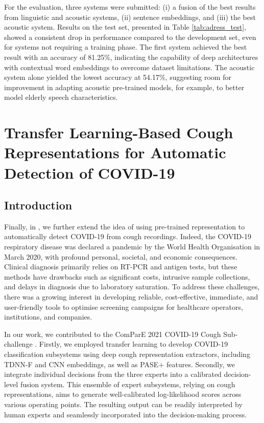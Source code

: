   For the evaluation, three systems were submitted: (i) a fusion of the best results from linguistic and acoustic systems, (ii) sentence embeddings, and (iii) the best acoustic system. Results on the test set, presented in Table \ref{tab:adress_test}, showed a consistent drop in performance compared to the development set, even for systems not requiring a training phase. The first system achieved the best result with an accuracy of 81.25\%, indicating the capability of deep architectures with contextual word embeddings to overcome dataset limitations. The acoustic system alone yielded the lowest accuracy at 54.17\%, suggesting room for improvement in adapting acoustic pre-trained models, for example, to better model elderly speech characteristics.



\section{Transfer Learning-Based Cough Representations for Automatic Detection of COVID-19}
\subsection{Introduction}
Finally, in \cite{SoleraUrea2021TransferLC}, we further extend the idea of using pre-trained representation to automatically detect COVID-19 from cough recordings. Indeed, the COVID-19 respiratory disease was declared a pandemic by the World Health Organisation in March 2020, with profound personal, societal, and economic consequences. Clinical diagnosis primarily relies on RT-PCR and antigen tests, but these methods have drawbacks such as significant costs, intrusive sample collections, and delays in diagnosis due to laboratory saturation. To address these challenges, there was a growing interest in developing reliable, cost-effective, immediate, and user-friendly tools to optimise screening campaigns for healthcare operators, institutions, and companies.

In our work, we contributed to the ComParE 2021 COVID-19 Cough Sub-challenge \cite{schuller21_interspeech}. Firstly, we employed transfer learning to develop COVID-19 classification subsystems using deep cough representation extractors, including \ac{TDNN-F} and \ac{CNN} embeddings, as well as \ac{PASE}+ features. Secondly, we integrate individual decisions from the three experts into a calibrated decision-level fusion system. This ensemble of expert subsystems, relying on cough representations, aims to generate well-calibrated log-likelihood scores across various operating points. The resulting output can be readily interpreted by human experts and seamlessly incorporated into the decision-making process.

